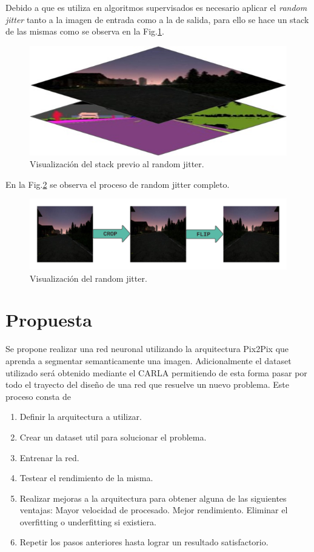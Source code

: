 \documentclass[]{IEEEtran}
\begin{document}
    Debido a que es utiliza en algoritmos supervisados es necesario aplicar 
    el \textit{random jitter} tanto a la imagen de entrada como a la de salida,
    para ello se hace un stack de las mismas como se observa en la Fig.\ref{fig:random-jitter}.

    \begin{figure}
        \centering
        \includegraphics[width=.4\textwidth]{Imgs/stack-random-jitter.jpeg}
        \caption{Visualización del stack previo al random jitter.}
        \label{fig:random-jitter}
    \end{figure}

    En la Fig.\ref{fig:crop-flip} se observa el proceso de random jitter completo.

    \begin{figure}
        \centering
        \includegraphics[width=.4\textwidth]{Imgs/in_crop_flip.png}
        \caption{Visualización del random jitter.}
        \label{fig:crop-flip}
    \end{figure}

    \section{Propuesta}

    Se propone realizar una red neuronal utilizando la arquitectura Pix2Pix que 
    aprenda a segmentar semanticamente una imagen. Adicionalmente el 
    dataset utilizado será obtenido mediante el CARLA permitiendo de esta forma 
    pasar por todo el trayecto del diseño de una red que resuelve un nuevo problema. 
    Este proceso consta de 

    \begin{enumerate}
        \item Definir la arquitectura a utilizar.
        \item Crear un dataset util para solucionar el problema.
        \item Entrenar la red.
        \item Testear el rendimiento de la misma.
        \item Realizar mejoras a la arquitectura para obtener alguna de las siguientes ventajas: 
            \subitem Mayor velocidad de procesado.
            \subitem Mejor rendimiento. 
            \subitem Eliminar el overfitting o underfitting si existiera.
        \item Repetir los pasos anteriores hasta lograr un resultado satisfactorio.
    \end{enumerate}
\end{document}
